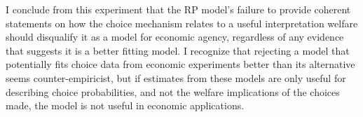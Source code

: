 \documentclass[../main.tex]{subfiles}
\begin{document}
I conclude from this experiment that the RP model's failure to provide coherent statements on how the choice mechanism relates to a useful interpretation welfare should disqualify it as a model for economic agency, regardless of any evidence that suggests it is a better fitting model.
I recognize that rejecting a model that potentially fits choice data from economic experiments better than its alternative seems counter-empiricist, but if estimates from these models are only useful for describing choice probabilities, and not the welfare implications of the choices made, the model is not useful in economic applications.

\end{document}
